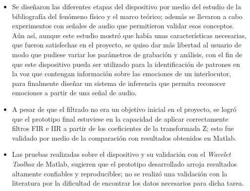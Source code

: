 \documentclass[11pt,lettersize]{article} %
\begin{document}
\begin{itemize}
	\item Se diseñaron las diferentes etapas del dispositivo por medio del estudio de la bibliografía del fenómeno físico y el marco teórico; además se llevaron a cabo experimentos con señales de audio que permitieron validar esos conceptos. Aún así, aunque este estudio mostró que había unas características necesarias, que fueron satisfechas en el proyecto, se quiso dar más libertad al usuario de modo que pudiese variar los parámetros de grabación y análisis, con el fin de que este dispositivo pueda ser utilizado para la identificación de patrones en la voz que contengan información sobre las emociones de un interlocutor, para finalmente diseñar un sistema de inferencia que permita reconocer emociones a partir de una señal de audio.




	\item A pesar de que el filtrado no era un objetivo inicial en el proyecto, se logró que el prototipo final estuviese en la capacidad de aplicar correctamente filtros FIR e IIR a partir de los coeficientes de la transformada Z; esto fue validado por medio de la comparación con resultados obtenidos en Matlab\textregistered.


	\item Las pruebas realizadas sobre el dispositivo y su validación con el \textit{Wavelet Toolbox} de Matlab\textregistered, sugieren que el prototipo desarrollado arroja resultados altamente confiables y reproducibles; no se realizó una validación con la literatura por la dificultad de encontrar los datos necesarios para dicha tarea.


\end{itemize}
\end{document}
